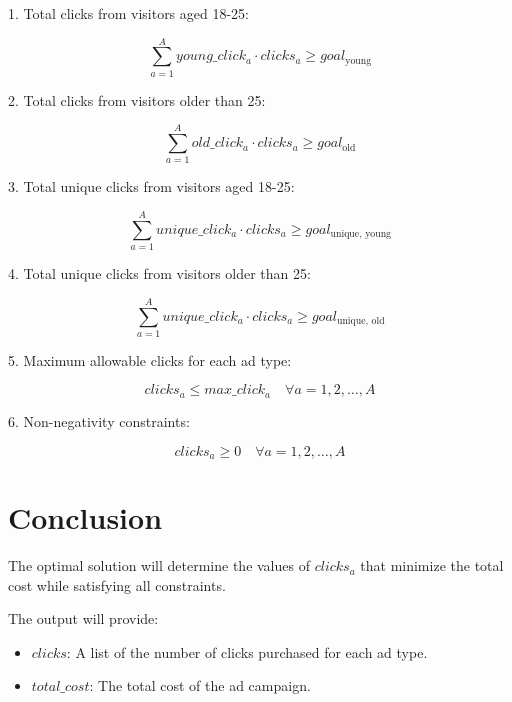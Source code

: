 \documentclass{article}
\begin{document}
1. Total clicks from visitors aged 18-25:

\[
\sum_{a=1}^{A} young\_click_a \cdot clicks_a \geq goal_{\text{young}}
\]

2. Total clicks from visitors older than 25:

\[
\sum_{a=1}^{A} old\_click_a \cdot clicks_a \geq goal_{\text{old}}
\]

3. Total unique clicks from visitors aged 18-25:

\[
\sum_{a=1}^{A} unique\_click_a \cdot clicks_a \geq goal_{\text{unique, young}}
\]

4. Total unique clicks from visitors older than 25:

\[
\sum_{a=1}^{A} unique\_click_a \cdot clicks_a \geq goal_{\text{unique, old}}
\]

5. Maximum allowable clicks for each ad type:

\[
clicks_a \leq max\_click_a \quad \forall a = 1, 2, \ldots, A
\]

6. Non-negativity constraints:

\[
clicks_a \geq 0 \quad \forall a = 1, 2, \ldots, A
\]

\section*{Conclusion}

The optimal solution will determine the values of \( clicks_a \) that minimize the total cost while satisfying all constraints.

The output will provide:

\begin{itemize}
    \item \( clicks \): A list of the number of clicks purchased for each ad type.
    \item \( total\_cost \): The total cost of the ad campaign.
\end{itemize}
\end{document}
